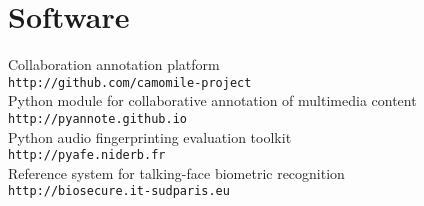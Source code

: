 \section{Software}



Collaboration annotation platform\\
\texttt{\small http://github.com/camomile-project}\\

Python module for collaborative annotation of multimedia content\\
\texttt{\small http://pyannote.github.io}\\

Python audio fingerprinting evaluation toolkit\\
\texttt{\small http://pyafe.niderb.fr} \cite{Ramona2011}\\

Reference system for talking-face biometric recognition\\
\texttt{\small http://biosecure.it-sudparis.eu} \cite{Bredin2006a}
